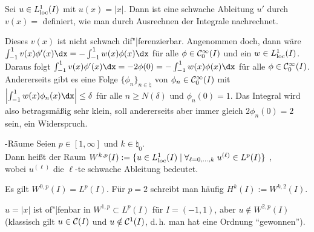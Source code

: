 \begin{Bsp}
    Sei $u \in L^1_{{\text{loc}}}(I)$ mit $u(x) = |x|$.
    Dann ist eine schwache Ableitung $u'$ durch\\
    $v(x) =$ 
    definiert, wie man durch Ausrechnen der Integrale nachrechnet.
\end{Bsp}

\begin{Bsp}
    Dieses $v(x)$ ist nicht schwach dif"|ferenzierbar.
    Angenommen doch, dann wäre\\
    $\int_{-1}^1 v(x)\phi'(x)\dx = -\int_{-1}^1 w(x)\phi(x)\dx$
    für alle $\phi \in \mathcal{C}_0^\infty(I)$ und ein $w \in L^1_{{\text{loc}}}(I)$.\\
    Daraus folgt $\int_{-1}^1 v(x)\phi'(x)\dx = -2\phi(0) =
    -\int_{-1}^1 w(x)\phi(x)\dx$ für alle $\phi \in \mathcal{C}_0^\infty(I)$.\\
    Andererseits gibt es eine Folge $\{\phi_n\}_{n \in \natural}$ von
    $\phi_n \in \mathcal{C}_0^\infty(I)$ mit
    $\left|\int_{-1}^1 w(x)\phi_n(x)\dx\right| \le \delta$ für alle
    $n \ge N(\delta)$ und $\phi_n(0) = 1$.
    Das Integral wird also betragsmäßig sehr klein, soll andererseits aber
    immer gleich $2\phi_n(0) = 2$ sein, ein Widerspruch.
\end{Bsp}

\linie

\begin{Def}{-Räume}
    Seien $p \in [1, \infty]$ und $k \in \natural_0$.\\
    Dann heißt der Raum
    $W^{k,p}(I) := \{u \in L^1_{{\text{loc}}}(I) \;|\;
    \forall_{\ell=0,\dotsc,k}\; u^{(\ell)} \in L^p(I)\}$
    ,\\
    wobei $u^{(\ell)}$ die $\ell$-te schwache Ableitung bedeutet.
\end{Def}

\begin{Bem}
    Es gilt $W^{0,p}(I) = L^p(I)$.
    Für $p = 2$ schreibt man häufig $H^k(I) := W^{k,2}(I)$.
\end{Bem}

\begin{Bsp}
    $u = |x|$ ist of"|fenbar in $W^{1,p} \subset L^p(I)$ für $I = (-1, 1)$,
    aber $u \notin W^{2,p}(I)$\\
    (klassisch gilt $u \in \mathcal{C}(I)$ und $u \notin \mathcal{C}^1(I)$, d.\,h. man hat
    eine Ordnung "`gewonnen"').
\end{Bsp}

